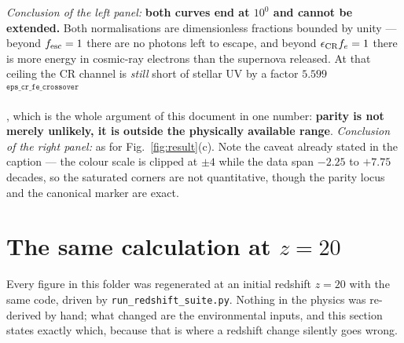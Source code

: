 \documentclass[11pt,a4paper]{article}
\newif\ifprovdraft
\newcommand{\src}[1]{%
  \ifprovdraft
    \ifmmode{}^{\text{\color{gray}\scriptsize\texttt{#1}}}%
    \else{\color{gray}\scriptsize$^{\texttt{#1}}$}%
    \fi
  \fi}
\begin{document}
\emph{Conclusion of the left panel:} \textbf{both curves end at $10^{0}$ and
cannot be extended.} Both normalisations are dimensionless fractions bounded by
unity --- beyond $f_{\rm esc} = 1$ there are no photons left to escape, and
beyond $\epsilon_{\rm CR}f_e = 1$ there is more energy in cosmic-ray electrons
than the supernova released. At that ceiling the CR channel is \emph{still}
short of stellar UV by a factor
$5.599$\src{eps\_cr\_fe\_crossover}, which is the whole argument of this
document in one number: \textbf{parity is not merely unlikely, it is outside the
physically available range}. \emph{Conclusion of the right panel:} as for
Fig.~\ref{fig:result}(c). Note the caveat already stated in the caption --- the
colour scale is clipped at $\pm4$ while the data span $-2.25$ to $+7.75$
decades, so the saturated corners are not quantitative, though the parity locus
and the canonical marker are exact.

\clearpage
\section{The same calculation at \texorpdfstring{$z=20$}{z = 20}}\label{sec:z20}
Every figure in this folder was regenerated at an initial redshift $z=20$ with
the same code, driven by \texttt{run\_redshift\_suite.py}. Nothing in the
physics was re-derived by hand; what changed are the environmental inputs, and
this section states exactly which, because that is where a redshift change
silently goes wrong.
\end{document}

